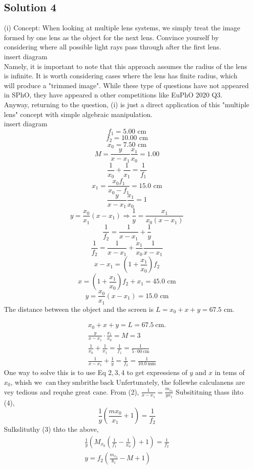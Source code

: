 \documentclass{article}
\begin{document}
\subsection{Solution 4}
(i) Concept: When looking at multiple lens systems, we simply treat the image formed by one lens as the object for the next lens. Convince yourself by considering where all possible light rays pass through after the first lens. \\
insert diagram \\
Namely, it is important to note that this approach assumes the radius of the lens is infinite. It is worth considering cases where the lens has finite radius, which will produce a "trimmed image". While these type of questions have not appeared in SPhO, they have appeared n other competitions like EuPhO 2020 Q3. \\
Anyway, returning to the question, (i) is just a direct application of this "multiple lens" concept with simple algebraic manipulation.\\
insert diagram
\[f_1 = 5.00 \text{ cm}\]
\[f_2 = 10.00 \text{ cm}\]
\[x_0 = 7.50 \text{ cm}\]
\[M = \frac{y}{x-x_1} \frac{x_1}{x_0} = 1.00\]
\[\frac{1}{x_0} + \frac{1}{x_1} = \frac{1}{f_1}\]
\[x_1 = \frac{x_0 f_1}{x_0 - f_1} = 15.0 \text{ cm}\]
\[\frac{y}{x-x_1} \frac{x_1}{x_0} = 1\]
\[y=\frac{x_0}{x_1} (x-x_1) \Rightarrow \frac{1}{y} = \frac{x_1}{x_0(x-x_1)}\]
\[\frac{1}{f_2} = \frac{1}{x-x_1} + \frac{1}{y}\]
\[ \frac{1}{f_2} = \frac{1}{x-x_1} + \frac{x_1}{x_0} \frac{1}{x-x_1} \]
\[ x - x_1 = \left(1+\frac{x_1}{x_0}\right) f_2 \]
\[x = \left(1+\frac{x_1}{x_0}\right) f_2 + x_1=45.0\text{ cm}\]
\[y = \frac{x_0}{x_1} (x-x_1) = 15.0\text{ cm}\]
The distance between the object and the screen is $L=x_0+x+y=67.5\text{ cm}$.

$$
\begin{array}{l}
	x_{0}+x+y=L=67.5 \mathrm{~cm} . \\
	\frac{y}{x-x_{1}} \cdot \frac{x_{1}}{x_{0}}=M=3 \\
	\frac{1}{x_{0}}+\frac{1}{x_{1}}=\frac{1}{f_{1}}=\frac{1}{5 \cdot 00 \mathrm{~cm}} \\
	\frac{1}{x-x_{1}}+\frac{1}{y}=\frac{1}{f_{2}}=\frac{1}{10.0 \mathrm{~mm}}
\end{array}
$$
One way to solve this is to use Eq $2,3,4$ to get expressiens of $y$ and $x$ in tems of $x_{0}$, whish we $\mathrm{~ c a n ~ t h e y ~ s m b r i t h e ~ b a c k}$ Unfertunately, the follewhe calculanens are vey tedious and requhe great cane.
From (2), $\frac{1}{x-x_{1}}=\frac{m_{x_{0}}}{y x_{1}}$
Subsititning thass ihto (4),
$$
\frac{1}{y}\left(\frac{m x_{0}}{x_{1}}+1\right)=\frac{1}{f_{2}}
$$
Sulkslituthy (3) thto the above,
$$
\begin{array}{l}
	\frac{1}{y}\left(M_{x_{0}}\left(\frac{1}{f_{1}}-\frac{1}{x_{0}}\right)+1\right)=\frac{1}{f_{2}} \\
	y=f_{2}\left(\frac{m_{x_{0}}}{8_{1}}-M+1\right)
\end{array}
$$
\end{document}
